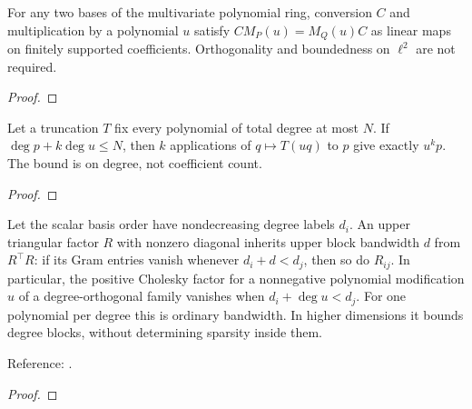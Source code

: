 \begin{supporting}
\begin{theorem}
\label{thm:multivariate-intertwining}
\leanok
For any two bases of the multivariate polynomial ring, conversion $C$ and
multiplication by a polynomial $u$ satisfy $C M_P(u)=M_Q(u)C$ as linear maps
on finitely supported coefficients. Orthogonality and boundedness on $\ell^2$
are not required.
\end{theorem}
\begin{proof}
\leanok
\end{proof}

\begin{theorem}
\label{thm:polynomial-section-padding}
\leanok
Let a truncation $T$ fix every polynomial of total degree at most $N$.
If $\deg p+k\deg u\le N$, then $k$ applications of $q\mapsto T(uq)$ to $p$
give exactly $u^kp$. The bound is on degree, not coefficient count.

\end{theorem}
\begin{proof}
\leanok
\end{proof}

\end{supporting}


\begin{theorem}
\label{thm:structured-measure-modification}
\leanok
Let the scalar basis order have nondecreasing degree labels $d_i$.
An upper triangular factor $R$ with nonzero diagonal inherits upper
block bandwidth $d$ from $R^\top R$: if its Gram entries vanish whenever
$d_i+d<d_j$, then so do $R_{ij}$. In particular, the positive Cholesky factor
for a nonnegative polynomial modification $u$ of a degree-orthogonal family
vanishes when $d_i+\deg u<d_j$.
For one polynomial per degree this is ordinary bandwidth. In higher dimensions
it bounds degree blocks, without determining sparsity inside them.

Reference: \cite[Lemma 2.8 and Section 5]{gutleb-olver-slevinsky}.
\end{theorem}
\begin{proof}
\leanok
\end{proof}

